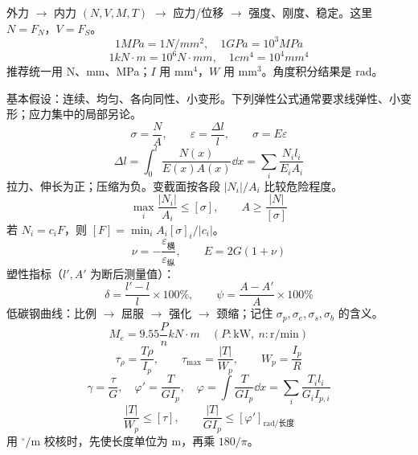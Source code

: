 \documentclass[a4paper,10pt,fontset=none]{ctexart}
\begin{document}
\fontsize{9.5}{13}\selectfont
{}
\begin{leftcol}
外力 $\to$ 内力 $(N,V,M,T)$ $\to$ 应力/位移 $\to$ 强度、刚度、稳定。这里 $N=F_N$，$V=F_S$。
\[
1\unit{MPa}=1\unit{N/mm^2},\quad 1\unit{GPa}=10^3\unit{MPa}
\]
\[
1\unit{kN\cdot m}=10^6\unit{N\cdot mm},\quad 1\unit{cm^4}=10^4\unit{mm^4}
\]
推荐统一用 N、mm、MPa；$I$ 用 $\mathrm{mm^4}$，$W$ 用 $\mathrm{mm^3}$。角度积分结果是 rad。

基本假设：连续、均匀、各向同性、小变形。下列弹性公式通常要求线弹性、小变形；应力集中的局部另论。
\[
\boxed{\sigma=\frac{N}{A}},\qquad \varepsilon=\frac{\Delta l}{l},\qquad \sigma=E\varepsilon
\]
\[
\Delta l=\int_0^l\frac{N(x)}{E(x)A(x)}\dd x
=\sum_i\frac{N_i l_i}{E_iA_i}
\]
拉力、伸长为正；压缩为负。变截面按各段 $|N_i|/A_i$ 比较危险程度。
\[
\max_i\frac{|N_i|}{A_i}\le[\sigma],\qquad
A\ge\frac{|N|}{[\sigma]}
\]
若 $N_i=c_i F$，则 $[F]=\min_i A_i[\sigma]_i/|c_i|$。
\[
\nu=-\frac{\varepsilon_{\text{横}}}{\varepsilon_{\text{纵}}},\qquad E=2G(1+\nu)
\]
塑性指标（$l',A'$ 为断后测量值）：
\[
\delta=\frac{l'-l}{l}\times100\%,\qquad
\psi=\frac{A-A'}{A}\times100\%
\]
低碳钢曲线：比例 $\to$ 屈服 $\to$ 强化 $\to$ 颈缩；记住 $\sigma_p,\sigma_e,\sigma_s,\sigma_b$ 的含义。
\[
M_e=9.55\frac{P}{n}\unit{kN\cdot m}
\quad(P:\mathrm{kW},\ n:\mathrm{r/min})
\]
\[
\boxed{\tau_\rho=\frac{T\rho}{I_p}},\qquad
\tau_{\max}=\frac{|T|}{W_p},\qquad W_p=\frac{I_p}{R}
\]
\[
\gamma=\frac{\tau}{G},\quad
\varphi'=\frac{T}{GI_p},\quad
\varphi=\int\frac{T}{GI_p}\dd x=\sum_i\frac{T_il_i}{G_iI_{p,i}}
\]
\[
\frac{|T|}{W_p}\le[\tau],\qquad
\frac{|T|}{GI_p}\le[\varphi']_{\text{rad/长度}}
\]
用 ${}^\circ/\mathrm m$ 校核时，先使长度单位为 m，再乘 $180/\pi$。
\end{leftcol}
\end{document}
